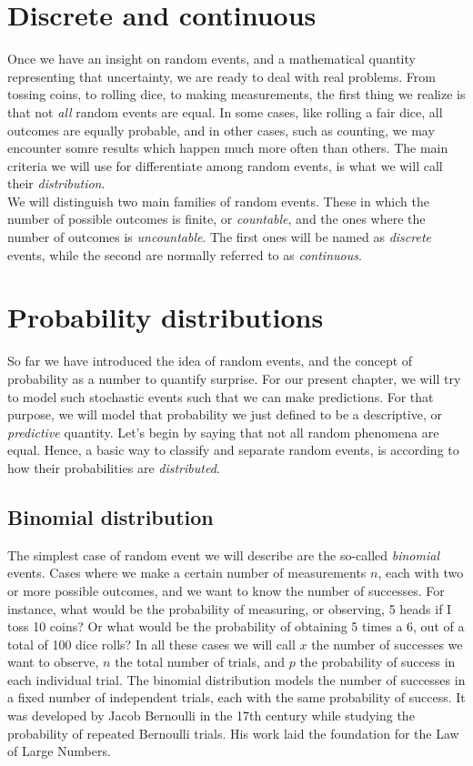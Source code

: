 \documentclass{book}
\begin{document}
\section{Discrete and continuous}
Once we have an insight on random events, and a mathematical quantity representing that uncertainty, we are ready to deal with real problems. From tossing coins, to rolling dice, to making measurements, the first thing we realize is that not \textit{all} random events are equal. In some cases, like rolling a fair dice, all outcomes are equally probable, and in other cases, such as counting, we may encounter somre results which happen much more often than others. The main criteria we will use for differentiate among random events, is what we will call their \textit{distribution}.\\

We will distinguish two main families of random events. These in which the number of possible outcomes is finite, or \textit{countable}, and the ones where the number of outcomes is \textit{uncountable}. The first ones will be named as \textit{discrete} events, while the second are normally referred to as \textit{continuous}.

\newpage

\section{Probability distributions}
So far we have introduced the idea of random events, and the concept of probability as a number to quantify surprise. For our present chapter, we will try to model such stochastic events such that we can make predictions. For that purpose, we will model that probability we just defined to be a descriptive, or \textit{predictive} quantity. Let's begin by saying that not all random phenomena are equal. Hence, a basic way to classify and separate random events, is according to how their probabilities are \textit{distributed}.

\subsection{Binomial distribution}
The simplest case of random event we will describe are the so-called \textit{binomial} events. Cases where we make a certain number of measurements $n$, each with two or more possible outcomes, and we want to know the number of successes. For instance, what would be the probability of measuring, or observing, 5 heads if I toss 10 coins? Or what would be the probability of obtaining 5 times a 6, out of a total of 100 dice rolls? In all these cases we will call $x$ the number of successes we want to observe, $n$ the total number of trials, and $p$ the probability of success in each individual trial. The binomial distribution models the number of successes in a fixed number of independent trials, each with the same probability of success. It was developed by Jacob Bernoulli in the 17th century while studying the probability of repeated Bernoulli trials. His work laid the foundation for the Law of Large Numbers.\\
\end{document}
